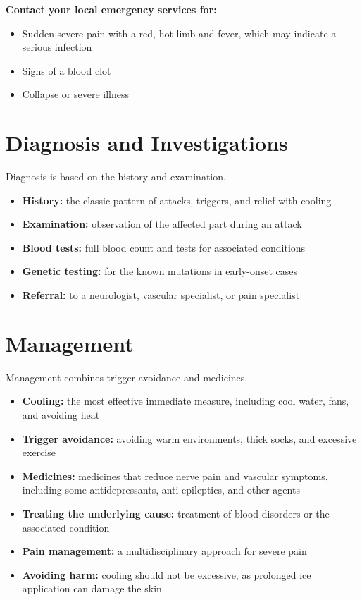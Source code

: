 \textbf{Contact your local emergency services for:}
\begin{itemize}
    \item Sudden severe pain with a red, hot limb and fever, which may indicate a serious infection
    \item Signs of a blood clot
    \item Collapse or severe illness
\end{itemize}

\section*{Diagnosis and Investigations}
Diagnosis is based on the history and examination.
\begin{itemize}
    \item \textbf{History:} the classic pattern of attacks, triggers, and relief with cooling
    \item \textbf{Examination:} observation of the affected part during an attack
    \item \textbf{Blood tests:} full blood count and tests for associated conditions
    \item \textbf{Genetic testing:} for the known mutations in early-onset cases
    \item \textbf{Referral:} to a neurologist, vascular specialist, or pain specialist
\end{itemize}

\section*{Management}
Management combines trigger avoidance and medicines.
\begin{itemize}
    \item \textbf{Cooling:} the most effective immediate measure, including cool water, fans, and avoiding heat
    \item \textbf{Trigger avoidance:} avoiding warm environments, thick socks, and excessive exercise
    \item \textbf{Medicines:} medicines that reduce nerve pain and vascular symptoms, including some antidepressants, anti-epileptics, and other agents
    \item \textbf{Treating the underlying cause:} treatment of blood disorders or the associated condition
    \item \textbf{Pain management:} a multidisciplinary approach for severe pain
    \item \textbf{Avoiding harm:} cooling should not be excessive, as prolonged ice application can damage the skin
\end{itemize}


